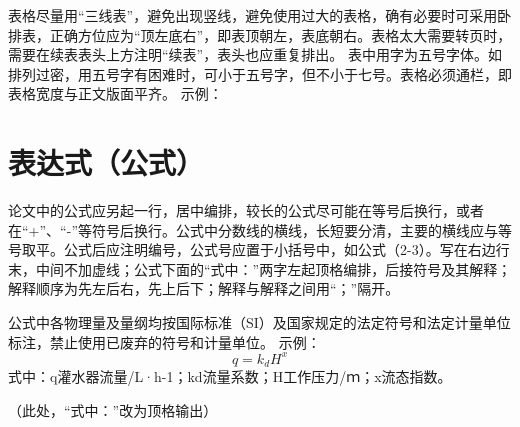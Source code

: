 表格尽量用“三线表”，避免出现竖线，避免使用过大的表格，确有必要时可采用卧排表，正确方位应为“顶左底右”，即表顶朝左，表底朝右。表格太大需要转页时，需要在续表表头上方注明“续表”，表头也应重复排出。
表中用字为五号字体。如排列过密，用五号字有困难时，可小于五号字，但不小于七号。表格必须通栏，即表格宽度与正文版面平齐。
示例：
\begin{table}[htp]
	\centering
    \label{tab:demo}    
\end{table}
\section{表达式（公式）}
论文中的公式应另起一行，居中编排，较长的公式尽可能在等号后换行，或者在“+”、“-”等符号后换行。公式中分数线的横线，长短要分清，主要的横线应与等号取平。公式后应注明编号，公式号应置于小括号中，如公式（2-3）。写在右边行末，中间不加虚线；公式下面的“式中：”两字左起顶格编排，后接符号及其解释；解释顺序为先左后右，先上后下；解释与解释之间用“；”隔开。

公式中各物理量及量纲均按国际标准（SI）及国家规定的法定符号和法定计量单位标注，禁止使用已废弃的符号和计量单位。
示例：
\begin{equation}
\label{eq:demo}
q=k_dH^x
\end{equation}
式中：q\cdash 灌水器流量/L·h-1；kd\cdash 流量系数；H\cdash 工作压力/ｍ；x\cdash 流态指数。 

（此处，“式中：”改为顶格输出）

